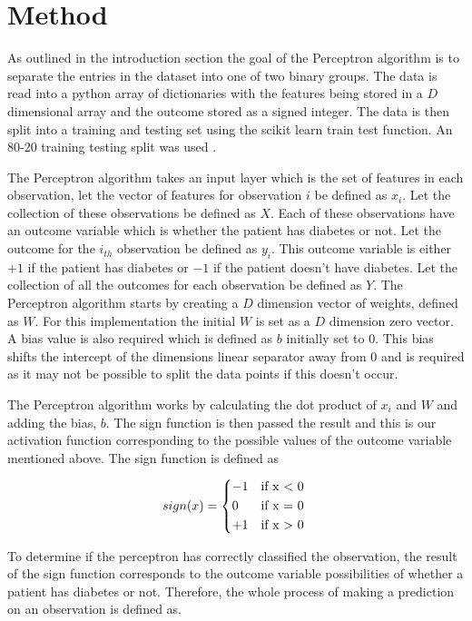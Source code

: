 \documentclass[10pt,twocolumn,letterpaper]{article}
\begin{document}
\section{Method}

As outlined in the introduction section the goal of the Perceptron algorithm is to separate
the entries in the dataset into one of two binary groups. The data is read into a python array
of dictionaries with the features being stored in a $D$ dimensional array and the outcome
stored as a signed integer. The data is then split into a training and testing set using the
scikit learn train test function. An 80-20 training testing split was used \cite{gholamy_why_nodate}.

The Perceptron algorithm takes an input layer which is the set of features in each observation, let
the vector of features for observation $i$ be defined as $x_i$. Let the collection of these observations
be defined as $X$. Each of these observations have an outcome variable which is whether the patient has
diabetes or not. Let the outcome for the $i_{th}$ observation be defined as $y_i$. This outcome variable
is either $+1$ if the patient has diabetes or $-1$ if the patient doesn't have diabetes. Let the collection
of all the outcomes for each observation be defined as $Y$. The Perceptron algorithm starts by creating a $D$
dimension vector of weights, defined as $W$. For this implementation the initial $W$ is set as a $D$ dimension
zero vector. A bias value is also required which is defined as $b$ initially set to $0$. This bias shifts the
intercept of the dimensions linear separator away from $0$ and is required as it may not be possible to
split the data points if this doesn't occur.

The Perceptron algorithm works by calculating the dot product of $x_i$ and $W$ and adding the bias, $b$.
The sign function is then passed the result and this is our activation function corresponding to the possible
values of the outcome variable mentioned above. The sign function is defined as

\begin{equation}
   sign(x)= \begin{cases*}
      -1 & if x $<$ 0 \\
      0  & if x = 0   \\
      +1 & if x $>$ 0 \\
   \end{cases*}
\end{equation}

To determine if the perceptron has correctly classified the observation, the result of the sign function
corresponds to the outcome variable possibilities of whether a patient has diabetes or not. Therefore, the
whole process of making a prediction on an observation is defined as.
\end{document}
